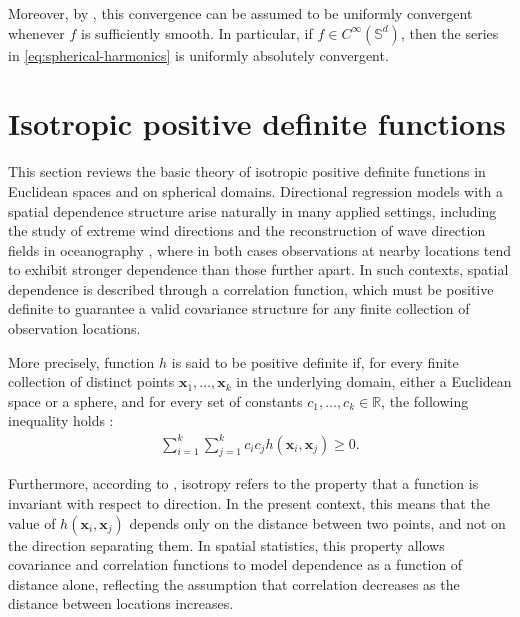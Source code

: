 \documentclass[12pt]{report} %
\newcommand{\bx}{\mathbf{x}}
\newcommand{\Sd}{\mathbb{S}^{d}}
\begin{document}
Moreover, by \citet[Theorem 2]{Kalf1995}, this convergence can be assumed to be uniformly convergent whenever $f$ is sufficiently smooth. In particular, if $f \in C^\infty(\mathbb{S}^d)$, then the series in \eqref{eq:spherical-harmonics} is uniformly absolutely convergent.



\section{Isotropic positive definite functions} \label{sec:isotropy}

This section reviews the basic theory of isotropic positive 
definite functions in Euclidean spaces and on spherical domains. 
Directional regression models with a spatial dependence structure 
arise naturally in many applied settings, including the study of 
extreme wind directions \citep{Coles1998} and the reconstruction 
of wave direction fields in oceanography \citep{Meilan-Vila2021a}, 
where in both cases observations at nearby locations tend to 
exhibit stronger dependence than those further apart. In such 
contexts, spatial dependence is described through a correlation 
function, which must be positive definite to guarantee a valid 
covariance structure for any finite collection of observation 
locations.

More precisely, function $h$ is said to be positive definite if, for every finite collection of distinct points $\bx_1,\ldots,\bx_k$ in the underlying domain, either a Euclidean space or a sphere, and for every set of constants $c_1,\ldots,c_k\in\mathbb{R}$, the following inequality holds
\citep{Gneiting2013}:
\begin{align}
    \label{eq:positive-definite}
    \sum_{i=1}^{k}\sum_{j=1}^{k} c_i c_j h(\bx_i,\bx_j)\geq 0.
\end{align}


Furthermore, according to \citet{Gneiting2013}, isotropy refers to the property that a function is invariant with respect to direction. In the present context, this means that the value of $h(\bx_i,\bx_j)$ depends only on the distance between two points, and not on the direction separating them. In spatial statistics, this property allows covariance and correlation functions to model dependence as a function of distance alone, reflecting the assumption that correlation decreases as the distance between locations increases.
\end{document}
